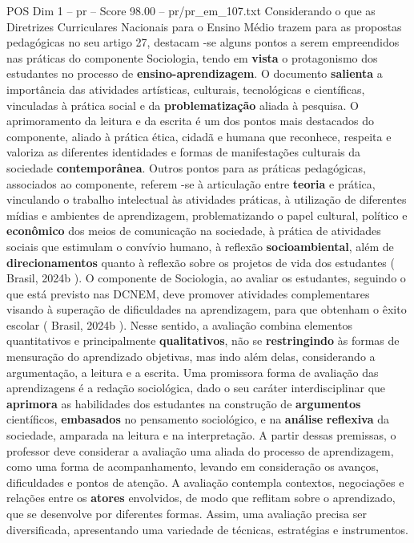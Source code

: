 \begin{textsample}{POS Dim 1 – pr – Score 98.00 – pr/pr\_em\_107.txt}
Considerando o que as Diretrizes Curriculares Nacionais para o Ensino Médio trazem para as propostas pedagógicas no seu artigo 27, destacam -se alguns pontos a serem empreendidos nas práticas do componente Sociologia, tendo em \textbf{vista} o protagonismo dos estudantes no processo de \textbf{ensino-aprendizagem}.
O documento \textbf{salienta} a importância das atividades artísticas, culturais, tecnológicas e científicas, vinculadas à prática social e da \textbf{problematização} aliada à pesquisa.
O aprimoramento da leitura e da escrita é um dos pontos mais destacados do componente, aliado à prática ética, cidadã e humana que reconhece, respeita e valoriza as diferentes identidades e formas de manifestações culturais da sociedade \textbf{contemporânea}.
Outros pontos para as práticas pedagógicas, associados ao componente, referem -se à articulação entre \textbf{teoria} e prática, vinculando o trabalho intelectual às atividades práticas, à utilização de diferentes mídias e ambientes de aprendizagem, problematizando o papel cultural, político e \textbf{econômico} dos meios de comunicação na sociedade, à prática de atividades sociais que estimulam o convívio humano, à reflexão \textbf{socioambiental}, além de \textbf{direcionamentos} quanto à reflexão sobre os projetos de vida dos estudantes ( Brasil, 2024b ).
O componente de Sociologia, ao avaliar os estudantes, seguindo o que está previsto nas DCNEM, deve promover atividades complementares visando à superação de dificuldades na aprendizagem, para que obtenham o êxito escolar ( Brasil, 2024b ).
Nesse sentido, a avaliação combina elementos quantitativos e principalmente \textbf{qualitativos}, não se \textbf{restringindo} às formas de mensuração do aprendizado objetivas, mas indo além delas, considerando a argumentação, a leitura e a escrita.
Uma promissora forma de avaliação das aprendizagens é a redação sociológica, dado o seu caráter interdisciplinar que \textbf{aprimora} as habilidades dos estudantes na construção de \textbf{argumentos} científicos, \textbf{embasados} no pensamento sociológico, e na \textbf{análise} \textbf{reflexiva} da sociedade, amparada na leitura e na interpretação.
A partir dessas premissas, o professor deve considerar a avaliação uma aliada do processo de aprendizagem, como uma forma de acompanhamento, levando em consideração os avanços, dificuldades e pontos de atenção.
A avaliação contempla contextos, negociações e relações entre os \textbf{atores} envolvidos, de modo que reflitam sobre o aprendizado, que se desenvolve por diferentes formas.
Assim, uma avaliação precisa ser diversificada, apresentando uma variedade de técnicas, estratégias e instrumentos.

\end{textsample}
